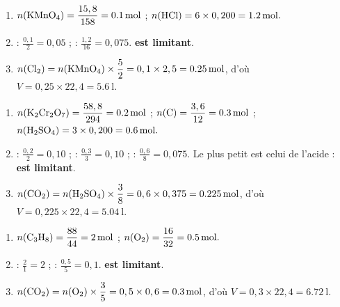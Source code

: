 \documentclass[11pt,a4paper]{article}
\begin{document}
\begin{corrige}
\begin{enumerate}[label=\alph*)]
  \item $n(\ce{KMnO4})=\dfrac{15,8}{158}=\qty{0.1}{\mole}$ ; $n(\ce{HCl})=6\times0,200=\qty{1.2}{\mole}.$
  \item {} : $\frac{0,1}{2}=0,05$ ;  : $\frac{1,2}{16}=0,075$.
        \textbf{ est limitant}.
  \item $n(\ce{Cl2})=n(\ce{KMnO4})\times\dfrac{5}{2}=0,1\times2,5=\qty{0.25}{\mole}$, d'où
        $V=0,25\times22,4=\qty{5.6}{\litre}.$
\end{enumerate}
\end{corrige}

\begin{corrige}
\begin{enumerate}[label=\alph*)]
  \item $n(\ce{K2Cr2O7})=\dfrac{58,8}{294}=\qty{0.2}{\mole}$ ; $n(\ce{C})=\dfrac{3,6}{12}=\qty{0.3}{\mole}$ ;
        $n(\ce{H2SO4})=3\times0,200=\qty{0.6}{\mole}.$
  \item {} : $\frac{0,2}{2}=0,10$ ;  : $\frac{0,3}{3}=0,10$ ;
         : $\frac{0,6}{8}=0,075$. Le plus petit est celui de l'acide :
        \textbf{ est limitant}.
  \item $n(\ce{CO2})=n(\ce{H2SO4})\times\dfrac{3}{8}=0,6\times0,375=\qty{0.225}{\mole}$, d'où
        $V=0,225\times22,4=\qty{5.04}{\litre}.$
\end{enumerate}
\end{corrige}

\begin{corrige}
\begin{enumerate}[label=\alph*)]
  \item $n(\ce{C3H8})=\dfrac{88}{44}=\qty{2}{\mole}$ ; $n(\ce{O2})=\dfrac{16}{32}=\qty{0.5}{\mole}.$
  \item {} : $\frac{2}{1}=2$ ;  : $\frac{0,5}{5}=0,1$. \textbf{ est limitant}.
  \item $n(\ce{CO2})=n(\ce{O2})\times\dfrac{3}{5}=0,5\times0,6=\qty{0.3}{\mole}$, d'où
        $V=0,3\times22,4=\qty{6.72}{\litre}.$
\end{enumerate}
\end{corrige}
\end{document}
